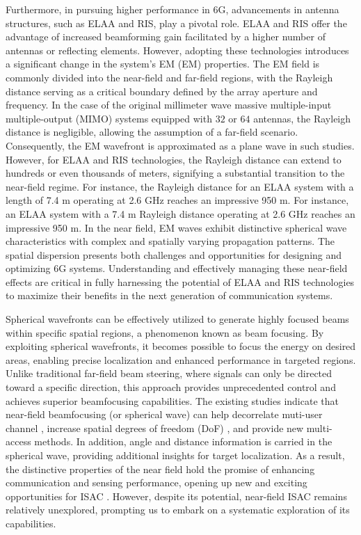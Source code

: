 \documentclass[10pt,journal,twocolumn,twoside]{IEEEtran} %
\begin{document}
Furthermore, in pursuing higher performance in 6G, advancements in antenna structures, such as ELAA and RIS, play a pivotal role. ELAA and RIS offer the advantage of increased beamforming gain facilitated by a higher number of antennas or reflecting elements. However, adopting these technologies introduces a significant change in the system's EM (EM) properties. The EM field is commonly divided into the near-field and far-field regions, with the Rayleigh distance serving as a critical boundary defined by the array aperture and frequency. In the case of the original millimeter wave massive multiple-input multiple-output (MIMO) systems equipped with $32$ or $64$ antennas, the Rayleigh distance is negligible, allowing the assumption of a far-field scenario. Consequently, the EM wavefront is approximated as a plane wave in such studies.
However, for ELAA and RIS technologies, the Rayleigh distance can extend to hundreds or even thousands of meters, signifying a substantial transition to the near-field regime. 
For instance, the Rayleigh distance for an ELAA system with a length of 7.4 m operating at 2.6 GHz reaches an impressive 950 m. 
For instance, an ELAA system with a 7.4 m Rayleigh distance operating at 2.6 GHz reaches an impressive 950 m.
 In the near field, EM waves exhibit distinctive spherical wave characteristics with complex and spatially varying propagation patterns. The spatial dispersion presents both challenges and opportunities for designing and optimizing 6G systems.  
Understanding and effectively managing these near-field effects are critical in fully harnessing the potential of ELAA and RIS technologies to maximize their benefits in the next generation of communication systems.


Spherical wavefronts can be effectively utilized to generate highly focused beams within specific spatial regions, a phenomenon known as beam focusing. By exploiting spherical wavefronts, it becomes possible to focus the energy on desired areas, enabling precise localization and enhanced performance in targeted regions. Unlike traditional far-field beam steering, where signals can only be directed toward a specific direction, this approach provides unprecedented control and achieves superior beamfocusing capabilities. 
The existing studies indicate that near-field beamfocusing (or spherical wave) can help decorrelate muti-user channel \cite{sperial}, increase spatial degrees of freedom (DoF) \cite{lu}, and provide new multi-access methods\cite{ldma}. In addition, angle and distance information is carried in the spherical wave, providing additional insights for target localization\cite{9508850}.
 As a result, the distinctive properties of the near field hold the promise of enhancing communication and sensing performance, opening up new and exciting opportunities for ISAC \cite{Wang2023NearFieldIS}. However, despite its potential, near-field ISAC remains relatively unexplored, prompting us to embark on a systematic exploration of its capabilities.
\end{document}
